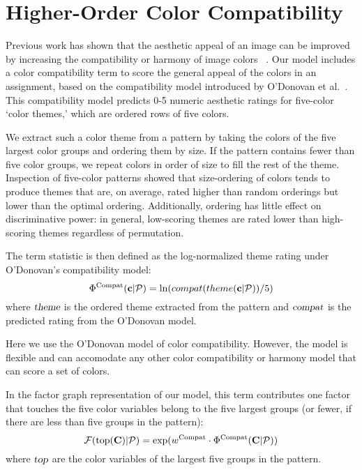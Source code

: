 \section{Higher-Order Color Compatibility}
\label{sec:colorCompat}

Previous work has shown that the aesthetic appeal of an image can be improved by increasing the compatibility or harmony of image colors ~\cite{CohenOrHarmonization,DressUp,ColorizationUsingHarmony,ODonovan}. Our model includes a color compatibility term to score the general appeal of the colors in an assignment, based on the compatibility model introduced by O'Donovan et al.~. This compatibility model predicts 0-5 numeric aesthetic ratings for five-color `color themes,' which are ordered rows of five colors. 

We extract such a color theme from a pattern by taking the colors of the five largest color groups and ordering them by size. If the pattern contains fewer than five color groups, we repeat colors in order of size to fill the rest of the theme. Inspection of five-color patterns showed that size-ordering of colors tends to produce themes that are, on average, rated higher than random orderings but lower than the optimal ordering. Additionally, ordering has little effect on discriminative power: in general, low-scoring themes are rated lower than high-scoring themes regardless of permutation.

The term statistic is then defined as the log-normalized theme rating under O'Donovan's compatibility model:
\begin{equation*}
\Phi^{\textrm{Compat}}(\mathbf{c}| \mathcal{P}) = \ln(compat(theme(\mathbf{c}| \mathcal{P}))/5)
\end{equation*}
where $\textsl{theme}$ is the ordered theme extracted from the pattern and $\textsl{compat}$ is the predicted rating from the O'Donovan model.

Here we use the O'Donovan model of color compatibility. However, the model is flexible and can accomodate any other color compatibility or harmony model that can score a set of colors.

In the factor graph representation of our model, this term contributes one factor that touches the five color variables belong to the five largest groups (or fewer, if there are less than five groups in the pattern):
\begin{equation*}
\mathcal{F}(\textrm{top}(\mathbf{C}) | \mathcal{P}) = \exp(w^{\textrm{Compat}} \cdot \Phi^{\textrm{Compat}}(\mathbf{C} | \mathcal{P}))
\end{equation*}
where $\textsl{top}$ are the color variables of the largest five groups in the pattern.